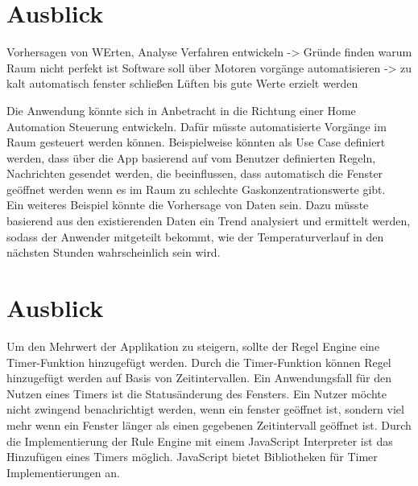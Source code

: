 
\chapter{Ausblick}
Vorhersagen von WErten,
Analyse Verfahren entwickeln -> Gründe finden warum Raum nicht perfekt ist
Software soll über Motoren vorgänge automatisieren -> zu kalt automatisch fenster schließen
Lüften bis gute Werte erzielt werden

Die Anwendung könnte sich in Anbetracht in die Richtung einer Home Automation Steuerung entwickeln. Dafür müsste automatisierte Vorgänge im Raum gesteuert werden können. Beispielweise könnten als Use Case definiert werden, dass über die App basierend auf vom Benutzer definierten Regeln, Nachrichten gesendet werden, die beeinflussen, dass automatisch die Fenster geöffnet werden wenn es im Raum zu schlechte Gaskonzentrationswerte gibt.  
\\Ein weiteres Beispiel könnte die Vorhersage von Daten sein. Dazu müsste basierend aus den existierenden Daten ein Trend analysiert und ermittelt werden, sodass der Anwender mitgeteilt bekommt, wie der Temperaturverlauf in den nächsten Stunden wahrscheinlich sein wird.
\chapter{Ausblick}
Um den Mehrwert der Applikation zu steigern, sollte der Regel Engine eine Timer-Funktion hinzugefügt werden. Durch die Timer-Funktion können Regel hinzugefügt werden auf Basis von Zeitintervallen. Ein Anwendungsfall für den Nutzen eines Timers ist die Statusänderung des Fensters. Ein Nutzer möchte nicht zwingend benachrichtigt werden, wenn ein fenster geöffnet ist, sondern viel mehr wenn ein Fenster länger als einen gegebenen Zeitintervall geöffnet ist. Durch die Implementierung der Rule Engine mit einem JavaScript Interpreter ist das Hinzufügen eines Timers möglich. JavaScript bietet Bibliotheken für Timer Implementierungen an.\\